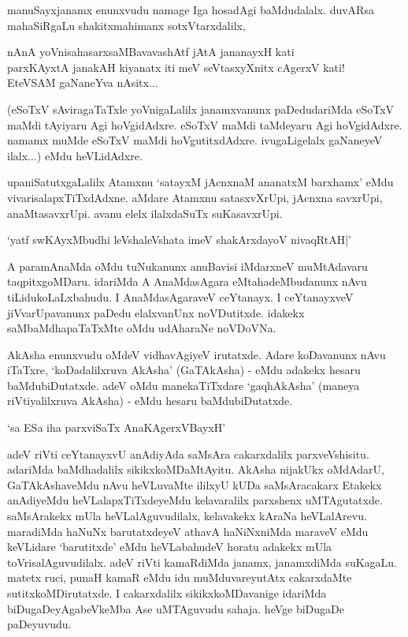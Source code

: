 manuSayxjanamx enunxvudu namage Iga hosadAgi baMdudalalx. duvARsa mahaSiRgaLu shakitxmahimanx sotxVtarxdalilx,

\begin{shloka}
nAnA yoVnisahasarxsaMBavavashAtf jAtA jananayxH kati\\
parxKAyxtA janakAH kiyanatx iti meV seVtasxyXnitx cAgerxV kati!\\
EteVSAM gaNaneYva nAsitx$\ldots$ 
\end{shloka}

(eSoTxV sAviragaTaTxle yoVnigaLalilx janamxvanunx paDedudariMda eSoTxV maMdi tAyiyaru Agi hoVgidAdxre. eSoTxV maMdi taMdeyaru Agi hoVgidAdxre. namamx muMde eSoTxV maMdi hoVgutitxdAdxre. ivugaLigelalx gaNaneyeV ilalx$\ldots$) eMdu heVLidAdxre.

upaniSatutxgaLalilx Atamxnu `satayxM jAcnxnaM ananatxM barxhamx' eMdu vivarisalapxTiTxdAdxne. aMdare Atamxnu satasxvXrUpi, jAcnxna savxrUpi, anaMtasavxrUpi. avanu elelx ilalxdaSuTx suKasavxrUpi.

\begin{shloka}
`yatf swKAyxMbudhi leVshaleVshata imeV shakArxdayoV nivaqRtAH|'
\end{shloka}

A paramAnaMda oMdu tuNukanunx anuBavisi iMdarxneV muMtAdavaru taqpitxgoMDaru. idariMda A AnaMdasAgara eMtahadeMbudanunx nAvu tiLidukoLaLxbahudu. I AnaMdasAgaraveV ceYtanayx. I ceYtanayxveV jiVvarUpavanunx paDedu elalxvanUnx noVDutitxde. idakekx saMbaMdhapaTaTxMte oMdu udAharaNe noVDoVNa.

AkAsha enunxvudu oMdeV vidhavAgiyeV irutatxde. Adare koDavanunx nAvu iTaTxre, `koDadalilxruva AkAsha' (GaTAkAsha) - eMdu adakekx hesaru baMdubiDutatxde. adeV oMdu manekaTiTxdare `gaqhAkAsha' (maneya riVtiyalilxruva AkAsha) - eMdu hesaru baMdubiDutatxde.

\begin{shloka}
`sa ESa iha  parxviSaTx AnaKAgerxVBayxH'
\end{shloka}

adeV riVti ceYtanayxvU anAdiyAda saMsAra cakarxdalilx parxveVshisitu. adariMda baMdhadalilx sikikxkoMDaMtAyitu. AkAsha nijakUkx oMdAdarU, GaTAkAshaveMdu nAvu heVLuvaMte ililxyU kUDa saMsAracakarx Etakekx anAdiyeMdu heVLalapxTiTxdeyeMdu kelavaralilx parxshenx uMTAgutatxde. saMsArakekx mUla heVLalAguvudilalx, kelavakekx kAraNa heVLalArevu. maradiMda haNuNx barutatxdeyeV athavA haNiNxniMda maraveV eMdu keVLidare `barutitxde' eMdu heVLabahudeV horatu adakekx mUla toVrisalAguvudilalx. adeV riVti kamaRdiMda janamx, janamxdiMda suKagaLu. matetx ruci, punaH kamaR eMdu idu muMduvareyutAtx cakarxdaMte sutitxkoMDirutatxde. I cakarxdalilx sikikxkoMDavanige idariMda biDugaDeyAgabeVkeMba Ase uMTAguvudu sahaja. heVge biDugaDe paDeyuvudu.

